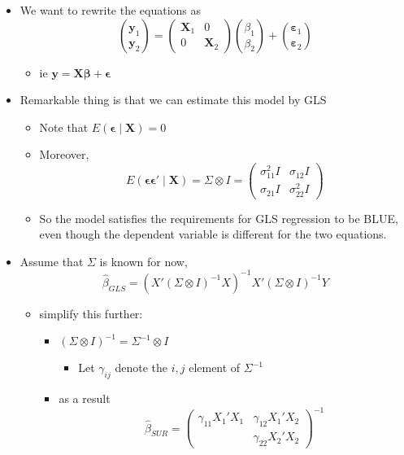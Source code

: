 \begin{itemize}
\item We want to rewrite the equations as
       \[ \binom{\mathbf{y}_1}{\mathbf{y}_2} = (\begin{matrix} \mathbf{X}_1
       & 0 \\ 0 & \mathbf{X}_2  \end{matrix})
       \binom{\beta_1}{\beta_2} +
      \binom{\mathbf{\varepsilon}_1}{\mathbf{\varepsilon}_2} \]
\begin{itemize}
\item ie $\mathbf{y} = \mathbf{X} \mathbf{\beta} + \mathbf{\epsilon}$
\end{itemize}
\item Remarkable thing is that we can estimate this model by GLS
\begin{itemize}
\item Note that $E(\mathbf{\epsilon} \mid \mathbf{X}) = 0$
\item Moreover, \[E(\mathbf{\epsilon} \mathbf{\epsilon}' \mid \mathbf{X}) =
         \Sigma \otimes I = (\begin{matrix} \sigma_{11}^2 I &
         \sigma_{12} I \\ \sigma_{21} I & \sigma_{22}^2
         I \end{matrix})\]
\item So the model satisfies the requirements for GLS regression to
         be BLUE, even though the dependent variable is different for
         the two equations.
\end{itemize}
\item Assume that $\Sigma$ is known for now, 
        \[\hat\beta_{GLS} = (X'(\Sigma \otimes I)^{-1}X)^{-1}X'(\Sigma
        \otimes I)^{-1}Y\]
\begin{itemize}
\item simplify this further:
\begin{itemize}
\item $(\Sigma \otimes I)^{-1} = \Sigma^{-1} \otimes I$
\begin{itemize}
\item Let $\gamma_{ij}$ denote the $i,j$ element of $\Sigma^{-1}$
\end{itemize}
\item as a result
           \[\hat\beta_{SUR} = (\begin{matrix}
            \gamma_{11} X_1'X_1 & \gamma_{12} X_1'X_2 \\
            & \gamma_{22} X_2'X_2 \end{matrix})^{-1} 
\]
\end{itemize}
\end{itemize}
\end{itemize}
